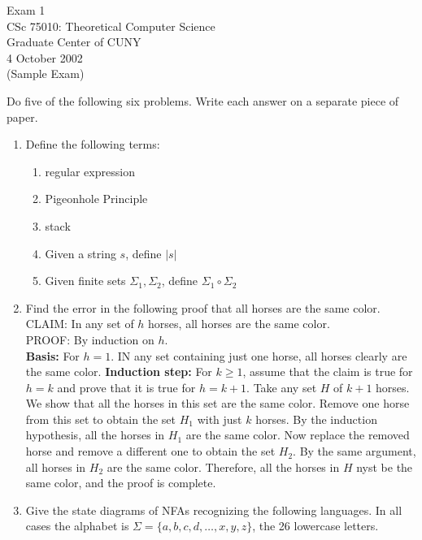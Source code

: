\documentclass[11pt]{article}
\begin{document}
\begin{center}
	Exam 1\\
        	CSc 75010: Theoretical Computer Science\\
        	Graduate Center of CUNY\\
	4 October 2002\\
        	(Sample Exam)
\end{center}

Do five of the following six problems.  Write each answer on a separate
piece of paper.


\begin{enumerate}
	\item Define the following terms:
     	   \begin{enumerate}
		\item regular expression
		\item Pigeonhole Principle
		\item stack
		\item Given a string $s$, define $|s|$
		\item Given finite sets $\Sigma_1, \Sigma_2$, 
			define $\Sigma_1 \circ \Sigma_2$
	   \end{enumerate}
   	\item Find the error in the following proof that all horses are the same color.\\
		CLAIM: In any set of $h$ horses, all horses are the same color.\\
		PROOF: By induction on $h$.\\
		{\bf Basis:} For $h=1$.  IN any set containing just one horse, all horses clearly
			are the same color.
		{\bf Induction step:} For $k\geq 1$, assume that the claim is true for $h=k$ and
			prove that it is true for $h=k+1$.   Take any set $H$ of $k+1$ horses.  We
			show that all the horses in this set are the same color.  Remove one horse
			from this set to obtain the set $H_1$ with just $k$ horses.  By the induction 
			hypothesis, all the horses in $H_1$ are the same color.  Now replace the 
			removed horse and remove a different one to obtain the set $H_2$.  By
			the same argument, all horses in $H_2$ are the same color.  Therefore,
			all the horses in $H$ nyst be the same color, and the proof is complete.
   	\item Give the state diagrams of NFAs recognizing the following languages.  In all
	    cases the alphabet is $\Sigma = \{a,b,c,d,\ldots,x,y,z\}$, the 26 lowercase letters.
	    \begin{enumerate}

\end{enumerate}
\end{enumerate}
\end{document}
